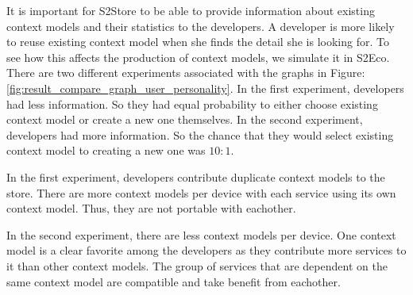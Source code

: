 It is important for S2Store to be able to provide information about existing context models and their statistics to the developers. A developer is more likely to reuse existing context model when she finds the detail she is looking for. To see how this affects the production of context models, we simulate it in S2Eco. There are two different experiments associated with the graphs in Figure: \ref{fig:result_compare_graph_user_personality}. In the first experiment, developers  had less information. So they had equal probability to either choose existing context model or create a new one themselves. In the second experiment, developers had more information. So the chance that they would select existing context model to creating a new one was $10:1$.

In the first experiment, developers contribute duplicate context models to the store. There are more context models per device with each service using its own context model. Thus, they are not portable with eachother.

In the second experiment, there are less context models per device. One context model is a clear favorite among the developers as they contribute more services to it than other context models. The group of services that are dependent on the same context model are compatible and take benefit from eachother.
